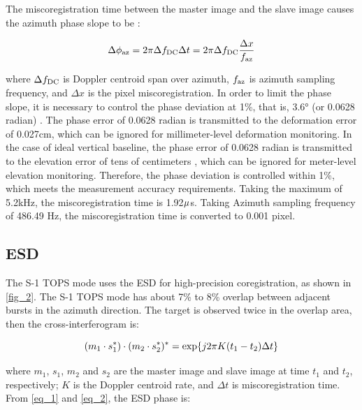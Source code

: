 \documentclass[a4paper,fleqn]{cas-sc}
\begin{document}
The miscoregistration time  between the master image and the slave image causes the azimuth phase slope to be \cite{Interferometric_Processing_of_Sentinel-1_TOPS_Data}:\par

\begin{equation}
    \Delta \phi_{\rm az} = 2 \pi \Delta f_{\rm DC} \Delta t = 2 \pi \Delta f_{\rm DC} \frac{\Delta x}{f_{\rm az}}
    \label{eq_1}
\end{equation}

\noindent where $\Delta f_{\rm DC}$ is Doppler centroid span over azimuth, $f_{\rm az}$ is azimuth sampling frequency, and $\Delta x$ is the pixel miscoregistration. In order to limit the phase slope, it is necessary to control the phase deviation at 1\%, that is, 3.6° (or 0.0628 radian) \cite{Interferometric_Processing_of_Sentinel-1_TOPS_Data}. The phase error of 0.0628 radian is transmitted to the deformation error of 0.027cm, which can be ignored for millimeter-level deformation monitoring. In the case of ideal vertical baseline, the phase error of 0.0628 radian is transmitted to the elevation error of tens of centimeters \cite{Effects_of_Phase_Error_on_the_Relative_Height_Accuracy_in_Interferometric_Synthetic_Aperture_Radar}, which can be ignored for meter-level elevation monitoring. Therefore, the phase deviation is controlled within 1\%, which meets the measurement accuracy requirements. Taking the maximum  of 5.2kHz, the miscoregistration time is 1.92$\rm\mu$s. Taking Azimuth sampling frequency of 486.49 Hz, the miscoregistration time is converted to 0.001 pixel. \par

\subsection{ESD}

The S-1 TOPS mode uses the ESD for high-precision coregistration, as shown in \ref{fig_2}. The S-1 TOPS mode has about 7\% to 8\% overlap between adjacent bursts in the azimuth direction. The target is observed twice in the overlap area, then the cross-interferogram is: \par

\begin{equation}
    (m_1 \cdot s_1^*) \cdot (m_2 \cdot s_2^*)^* = {\rm exp} \{j 2 \pi K (t_1 - t_2) \Delta t \}
    \label{eq_2}
\end{equation}

\noindent where $m_1$, $s_1$, $m_2$ and $s_2$ are the master image and slave image at time $t_1$ and $t_2$, respectively; $K$ is the Doppler centroid rate, and $\Delta t$ is miscoregistration time. From \ref{eq_1} and \ref{eq_2}, the ESD phase is: \par
\end{document}
